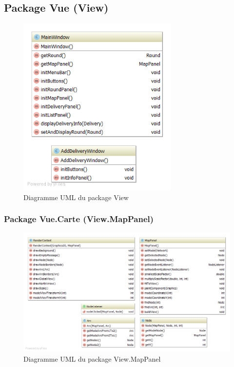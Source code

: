 \subsection{Package Vue (View)}

\begin{figure}[h]
    \centering
    \includegraphics[width=80mm]{../diagrams/classes_packages/classes_packages/view/view.png}
    \caption{Diagramme UML du package View}
    \label{diagram:uml_view}
\end{figure}
\pagebreak

\subsubsection{Package Vue.Carte (View.MapPanel)}

\begin{figure}[h]
    \centering
    \includegraphics[width=160mm]{../diagrams/classes_packages/classes_packages/view/package_map.png}
    \caption{Diagramme UML du package View.MapPanel}
    \label{diagram:uml_view_map}
\end{figure}
\pagebreak

